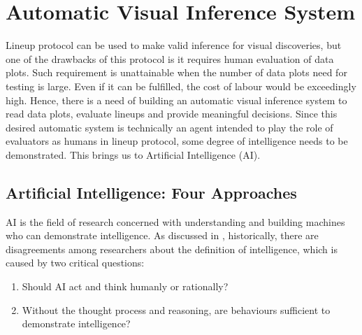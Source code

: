 \documentclass{monashthesis}
\theoremstyle{definition}
\theoremstyle{definition}
\theoremstyle{definition}
\theoremstyle{definition}
\theoremstyle{remark}
\begin{document}
\hypertarget{automatic-visual-inference-system}{%
\section{Automatic Visual Inference System}\label{automatic-visual-inference-system}}

Lineup protocol can be used to make valid inference for visual discoveries, but one of the drawbacks of this protocol is it requires human evaluation of data plots. Such requirement is unattainable when the number of data plots need for testing is large. Even if it can be fulfilled, the cost of labour would be exceedingly high. Hence, there is a need of building an automatic visual inference system to read data plots, evaluate lineups and provide meaningful decisions. Since this desired automatic system is technically an agent intended to play the role of evaluators as humans in lineup protocol, some degree of intelligence needs to be demonstrated. This brings us to Artificial Intelligence (AI).

\hypertarget{se:ai}{%
\subsection{Artificial Intelligence: Four Approaches}\label{se:ai}}

AI is the field of research concerned with understanding and building machines who can demonstrate intelligence. As discussed in \textcite{russell_artificial_2002}, historically, there are disagreements among researchers about the definition of intelligence, which is caused by two critical questions:

\begin{enumerate}
\def\labelenumi{\arabic{enumi}.}
\tightlist
\item
  Should AI act and think humanly or rationally?
\item
  Without the thought process and reasoning, are behaviours sufficient to demonstrate intelligence?
\end{enumerate}
\end{document}
